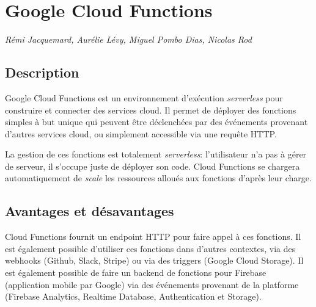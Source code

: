 \documentclass[a4paper, 11pt]{book}
\begin{document}
\noindent

\titleformat{\chapter}[display]
{\normalfont\huge\bfseries}{\chaptertitlename\ \thechapter}{20pt}{\Huge}
\titlespacing*{\chapter}{0pt}{0pt}{3pt}
\titlespacing*{\section}{0pt}{5pt}{5pt}

\chapter*{Google Cloud Functions}
\emph{Rémi Jacquemard, Aurélie Lévy, Miguel Pombo Dias, Nicolas Rod}
\section*{Description}
Google Cloud Functions est un environnement d'exécution \textit{serverless} pour construire et connecter des services cloud. Il permet de déployer des fonctions simples à but unique qui peuvent être déclenchées par des événements provenant d'autres services cloud, ou simplement accessible via une requête HTTP.

La gestion de ces fonctions est totalement \textit{serverless}: l'utilisateur n'a pas à gérer de serveur, il s'occupe juste de déployer son code. Cloud Functions se chargera automatiquement de \textit{scale} les ressources alloués aux fonctions d'après leur charge.

\section*{Avantages et désavantages}
Cloud Functions fournit un endpoint HTTP pour faire appel à ces fonctions. Il est également possible d'utiliser ces fonctions dans d'autres contextes, via des webhooks (Github, Slack, Stripe) ou via des triggers (Google Cloud Storage). Il est également possible de faire un backend de fonctions pour Firebase (application mobile par Google) via des événements provenant de la platforme (Firebase Analytics, Realtime Database, Authentication et Storage).
\end{document}

